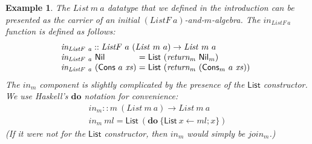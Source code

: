 \documentclass{jfp1}
\newtheorem{example}{Example}
\newcommand{\kw}[1]{\textbf{#1}}
\begin{document}
\begin{example}
  The $\mathit{List}~m~a$ datatype that we defined in the introduction
  can be presented as the carrier of an initial
  $(\mathit{ListF}~a)$-and-$m$-algebra. The $\mathit{in_{\mathit{ListF}~a}}$
  function is defined as follows:
  \begin{displaymath}
    \begin{array}{l}
      \mathit{in_{\mathit{ListF}~a}} :: \mathit{ListF}~a~(\mathit{List}~m~a) \to \mathit{List}~m~a \\
      \begin{array}{@{}l@{\hspace{0.3em}}c@{\hspace{0.3em}}l}
        \mathit{in_{\mathit{ListF}~a}}~\mathsf{Nil}&=&\mathsf{List}~(\mathit{return_m}~\mathsf{Nil}_m) \\
        \mathit{in_{\mathit{ListF}~a}}~(\mathsf{Cons}~a~\mathit{xs})&=&\mathsf{List}~(\mathit{return_m}~(\mathsf{Cons}_m~a~\mathit{xs})) \\
      \end{array}
    \end{array}
  \end{displaymath}
  The $\mathit{in_m}$ component is slightly complicated by the
  presence of the $\mathsf{List}$ constructor. We use Haskell's
  $\kw{do}$ notation for convenience:
  \begin{displaymath}
    \begin{array}{l}
      \mathit{in_m} :: m~(\mathit{List}~m~a) \to \mathit{List}~m~a \\
      \mathit{in_m}~\mathit{ml} = \mathsf{List}~(\kw{do}~\{ \mathsf{List}~x \leftarrow \mathit{ml}; x \})
    \end{array}
  \end{displaymath}
  (If it were not for the $\mathsf{List}$ constructor, then
  $\mathit{in_m}$ would simply be $\mathit{join_m}$.)


\end{example}
\end{document}
